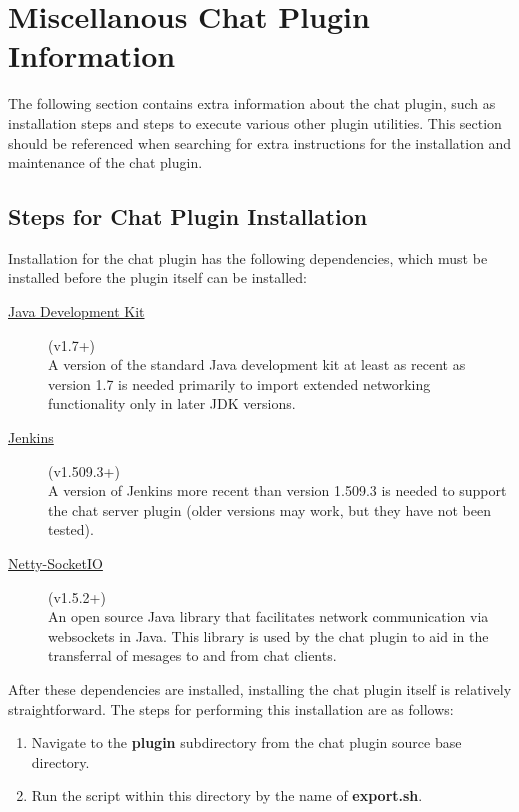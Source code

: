 \documentclass{article}
\begin{document}
	\section[Appendix]{Miscellanous Chat Plugin Information}
	The following section contains extra information about the chat plugin,
	such as installation steps and steps to execute various other plugin
	utilities.  This section should be referenced when searching for extra
	instructions for the installation and maintenance of the chat plugin.

		\subsection[Plugin Installation]{Steps for Chat Plugin Installation}
		Installation for the chat plugin has the following dependencies, which
		must be installed before the plugin itself can be installed:

		\begin{description}
			\item[\href{http://www.oracle.com/technetwork/java/javase/downloads/jdk7-downloads-1880260.html}{Java Development Kit}] (v1.7+) \hfill \\
			A version of the standard Java development kit at least as recent 
			as version 1.7 is needed primarily to import extended networking 
			functionality only in later JDK versions.

			\item[\href{http://jenkins-ci.org/}{Jenkins}] (v1.509.3+) \hfill \\
			A version of Jenkins more recent than version 1.509.3 is needed
			to support the chat server plugin (older versions may work, but they
			have not been tested).

			\item[\href{https://github.com/mrniko/netty-socketio/releases}{Netty-SocketIO}] (v1.5.2+) \hfill \\ 
			An open source Java library that facilitates network communication 
			via websockets in Java.  This library is used by the chat plugin
			to aid in the transferral of mesages to and from chat clients.
		\end{description}

		After these dependencies are installed, installing the chat plugin itself
		is relatively straightforward.  The steps for performing this installation
		are as follows:

		\begin{enumerate}
			\item Navigate to the \textbf{plugin} subdirectory from the chat
			plugin source base directory.

			\item Run the script within this directory by the name of 
			\textbf{export.sh}.
		\end{enumerate}
\end{document}
